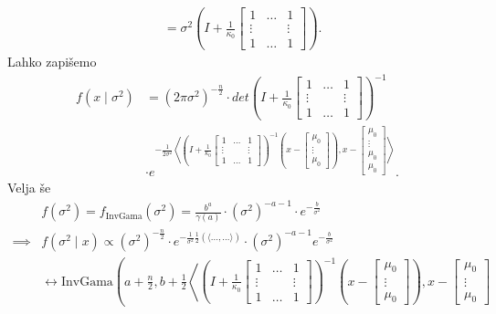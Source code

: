 \documentclass[a4paper, 12pt]{book}
\theoremstyle{definition}
\theoremstyle{remark}
\begin{document}
\begin{enumerate}[label=(\roman*)]
\begin{align*}
      &= \sigma^2 \left(I + \frac{1}{\kappa_0} \begin{bmatrix}1&\dots&1\\\vdots&&\vdots\\1&\dots&1\end{bmatrix}\right).
    \end{align*}
    Lahko zapišemo
    \begin{align*}
      f(x \mid \sigma^2) &= (2 \pi \sigma^2)^{-\frac{n}{2}} \cdot
        det \left(I + \frac{1}{\kappa_0} \begin{bmatrix}1&\dots&1\\\vdots&&\vdots\\1&\dots&1\end{bmatrix}\right)^{-1} \\
      &\cdot e^{-\frac{1}{2\sigma^2} \left\langle 
          \left(I + \frac{1}{\kappa_0} \begin{bmatrix}1&\dots&1\\\vdots&&\vdots\\1&\dots&1\end{bmatrix}\right)^{-1}
          \left(x - \begin{bmatrix}\mu_0\\\vdots\\\mu_0\end{bmatrix}\right), x - \begin{bmatrix}\mu_0\\\vdots\\\mu_0\\\mu_0\end{bmatrix}
        \right\rangle}.
    \end{align*}
    Velja še
    \begin{align*}
      &f(\sigma^2) = f_{\text{InvGama}}(\sigma^2) = \frac{b^a}{\gamma(a)} \cdot (\sigma^2)^{-a-1} \cdot e^{-\frac{b}{\sigma^2}} \\
      \implies &f(\sigma^2 \mid x) \propto (\sigma^2)^{-\frac{n}{2}} \cdot
        e^{-\frac{1}{\sigma^2} \frac{1}{2} \left(\langle \dots, \dots \rangle\right)} \cdot (\sigma^2)^{-a-1} e^{-\frac{b}{\sigma^2}} \\
        &\leftrightarrow \text{InvGama}\left(a + \frac{n}{2},
          b + \frac{1}{2} \left\langle
            \left(I + \frac{1}{\kappa_0} \begin{bmatrix}1&\dots&1\\\vdots&&\vdots\\1&\dots&1\end{bmatrix}\right)^{-1}
            \left(x - \begin{bmatrix}\mu_0\\\vdots\\\mu_0\end{bmatrix}\right), x - \begin{bmatrix}\mu_0\\\vdots\\\mu_0\end{bmatrix}

\end{align*}
\end{enumerate}
\end{document}
